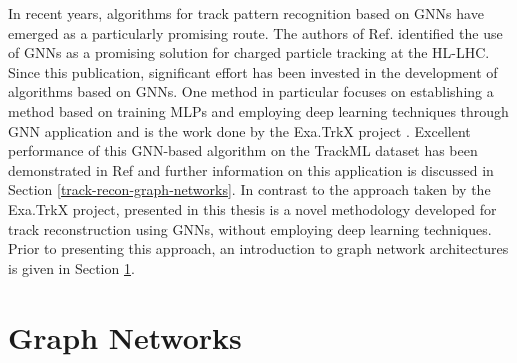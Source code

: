 In recent years, algorithms for track pattern recognition based on GNNs have emerged as a particularly promising route. The authors of Ref. \cite{farrell2018novel} identified the use of GNNs as a promising solution for charged particle tracking at the HL-LHC. Since this publication, significant effort has been invested in the development of algorithms based on GNNs. One method in particular focuses on establishing a method based on training MLPs and employing deep learning techniques through GNN application and is the work done by the Exa.TrkX project \cite{ExaTrkX-website, Caillou:2815578}. Excellent performance of this GNN-based algorithm on the TrackML dataset \cite{refId0} has been demonstrated in Ref \cite{Ju_2021} and further information on this application is discussed in Section \ref{track-recon-graph-networks}. In contrast to the approach taken by the Exa.TrkX project, presented in this thesis is a novel methodology developed for track reconstruction using GNNs, without employing deep learning techniques. Prior to presenting this approach, an introduction to graph network architectures is given in Section \ref{graph-networks}.






\section{Graph Networks}
\label{graph-networks}

